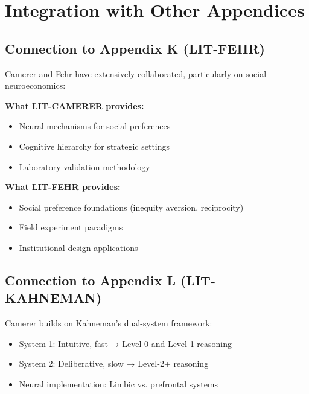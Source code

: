 \section{Integration with Other Appendices}
\label{sec:ca-integration}

\subsection{Connection to Appendix K (LIT-FEHR)}

Camerer and Fehr have extensively collaborated, particularly on social neuroeconomics:

\begin{tcolorbox}[colback=yellow!5!white, colframe=yellow!75!black,
    title=Integration: LIT-CAMERER $\leftrightarrow$ LIT-FEHR]
\textbf{What LIT-CAMERER provides:}
\begin{itemize}[nosep]
\item Neural mechanisms for social preferences
\item Cognitive hierarchy for strategic settings
\item Laboratory validation methodology
\end{itemize}

\textbf{What LIT-FEHR provides:}
\begin{itemize}[nosep]
\item Social preference foundations (inequity aversion, reciprocity)
\item Field experiment paradigms
\item Institutional design applications
\end{itemize}
\end{tcolorbox}

\subsection{Connection to Appendix L (LIT-KAHNEMAN)}

Camerer builds on Kahneman's dual-system framework:

\begin{itemize}[nosep]
\item System 1: Intuitive, fast → Level-0 and Level-1 reasoning
\item System 2: Deliberative, slow → Level-2+ reasoning
\item Neural implementation: Limbic vs. prefrontal systems
\end{itemize}

